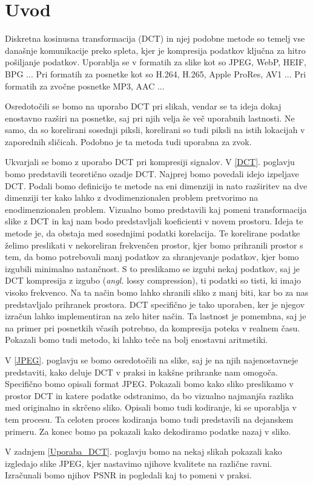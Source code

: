 \documentclass[a4paper,12pt,openright]{book}
\begin{document}
\chapter{Uvod}
Diskretna kosinusna transformacija (DCT) in njej podobne metode so temelj vse današnje komunikacije preko spleta, kjer je kompresija podatkov ključna za hitro pošiljanje podatkov. Uporablja se v formatih za slike kot so JPEG, WebP, HEIF, BPG ... Pri formatih za posnetke kot so H.264, H.265, Apple ProRes, AV1 ... Pri formatih za zvočne posnetke MP3, AAC ... \par
Osredotočili se bomo na uporabo DCT pri slikah, vendar se ta ideja dokaj enostavno razširi na posnetke, saj pri njih velja še več uporabnih lastnosti. Ne samo, da so korelirani sosednji piksli, korelirani so tudi piksli na istih lokacijah v zaporednih sličicah. Podobno je ta metoda tudi uporabna za zvok.\par
Ukvarjali se bomo z uporabo DCT pri kompresiji signalov. V \ref{DCT}. poglavju bomo predstavili teoretično ozadje DCT. Najprej bomo povedali idejo izpeljave DCT. Podali bomo definicijo te metode na eni dimenziji in nato razširitev na dve dimenziji ter kako lahko z dvodimenzionalen problem pretvorimo na enodimenzionalen problem. Vizualno bomo predstavili kaj pomeni transformacija slike z DCT in kaj nam bodo predstavljali koeficienti v novem prostoru. Ideja te metode je, da obstaja med sosednjimi podatki korelacija. Te korelirane podatke želimo preslikati v nekoreliran frekvenčen prostor, kjer bomo prihranili prostor s tem, da bomo potrebovali manj podatkov za shranjevanje podatkov, kjer bomo izgubili minimalno natančnost. S to preslikamo se izgubi nekaj podatkov, saj je DCT kompresija z izgubo (\textit{angl.} lossy compression), ti podatki so tisti, ki imajo visoko frekvenco. Na ta način bomo lahko shranili sliko z manj biti, kar bo za nas predstavljalo prihranek prostora. DCT specifično je tako uporaben, ker je njegov izračun lahko implementiran na zelo hiter način. Ta lastnost je pomembna, saj je na primer pri posnetkih včasih potrebno, da kompresija poteka v realnem času. Pokazali bomo tudi metodo, ki lahko teče na bolj enostavni aritmetiki.\par
V \ref{JPEG}. poglavju se bomo osredotočili na slike, saj je na njih najenostavneje predstaviti, kako deluje DCT v praksi in kakšne prihranke nam omogoča. Specifično bomo opisali format JPEG. Pokazali bomo kako sliko preslikamo v prostor DCT in katere podatke odstranimo, da bo vizualno najmanjša razlika med originalno in skrčeno sliko. Opisali bomo tudi kodiranje, ki se uporablja v tem procesu. Ta celoten proces kodiranja bomo tudi predstavili na dejanskem primeru. Za konec bomo pa pokazali kako dekodiramo podatke nazaj v sliko.\par
V zadnjem \ref{Uporaba_DCT}. poglavju bomo na nekaj slikah pokazali kako izgledajo slike JPEG, kjer nastavimo njihove kvalitete na različne ravni. Izračunali bomo njihov PSNR in pogledali kaj to pomeni v praksi.\par
\end{document}
